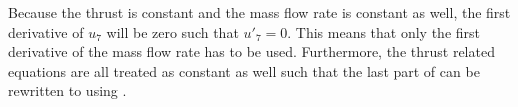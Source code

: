 
Because the thrust is constant and the mass flow rate is constant as well, the first derivative of $u_{7}$ will be zero such that $u'_{7}=0$. This means that only the first derivative of the mass flow rate has to be used. Furthermore, the thrust related equations are all treated as constant as well such that the last part of  can be rewritten to  using .

